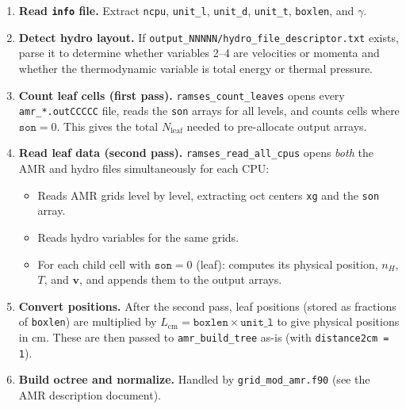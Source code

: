 \documentclass[english,a4paper]{my_memo}
\begin{document}
\begin{enumerate}
  \item \textbf{Read \texttt{info} file.}  Extract \texttt{ncpu},
        \texttt{unit\_l}, \texttt{unit\_d}, \texttt{unit\_t},
        \texttt{boxlen}, and $\gamma$.

  \item \textbf{Detect hydro layout.}  If
        \texttt{output\_NNNNN/hydro\_file\_descriptor.txt} exists, parse it to
        determine whether variables 2--4 are velocities or momenta and whether
        the thermodynamic variable is total energy or thermal pressure.

  \item \textbf{Count leaf cells (first pass).}
        \texttt{ramses\_count\_leaves} opens every
        \texttt{amr\_*.outCCCCC} file, reads the \texttt{son} arrays for
        all levels, and counts cells where $\texttt{son} = 0$.  This gives
        the total $N_\mathrm{leaf}$ needed to pre-allocate output arrays.

  \item \textbf{Read leaf data (second pass).}
        \texttt{ramses\_read\_all\_cpus} opens \emph{both} the AMR and
        hydro files simultaneously for each CPU:
        \begin{itemize}
          \item Reads AMR grids level by level, extracting oct centers
                \texttt{xg} and the \texttt{son} array.
          \item Reads hydro variables for the same grids.
          \item For each child cell with $\texttt{son} = 0$ (leaf): computes
                its physical position, $n_H$, $T$, and $\boldsymbol{v}$, and
                appends them to the output arrays.
        \end{itemize}

  \item \textbf{Convert positions.}  After the second pass, leaf positions
        (stored as fractions of \texttt{boxlen}) are multiplied by
        $L_\mathrm{cm} = \texttt{boxlen} \times \texttt{unit\_l}$ to give
        physical positions in cm.  These are then passed to
        \texttt{amr\_build\_tree} as-is (with \texttt{distance2cm = 1}).

  \item \textbf{Build octree and normalize.}  Handled by
        \texttt{grid\_mod\_amr.f90} (see the AMR description document).
\end{enumerate}
\end{document}
